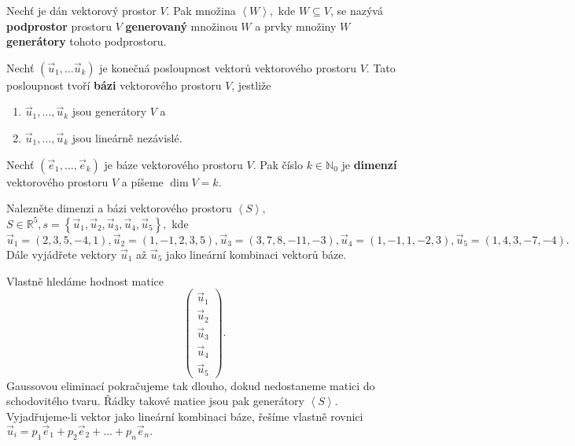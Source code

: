 \begin{definition}
    Nechť je dán vektorový prostor $V$. Pak množina $\left < W \right >,$ kde $
    W\subseteq V$, se nazývá \textbf{podprostor} prostoru $V$ \textbf{generovaný}
    množinou $W$ a prvky množiny $W$ \textbf{generátory} tohoto podprostoru.
\end{definition}

\begin{definition}
    Nechť $(\vec u_1, \dots \vec u_k)$ je konečná posloupnost vektorů vektorového
    prostoru $V$. Tato posloupnost tvoří \textbf{bázi} vektorového prostoru $V$, jestliže
    \begin{enumerate}[$i.$]
    \item $\vec u_1, \dots, \vec u_k$ jsou generátory $V$ a
   	\item $\vec u_1, \dots, \vec u_k$ jsou lineárně nezávislé.
    \end{enumerate}
\end{definition}

\begin{definition}
Nechť $(\vec e_1,\dots, \vec e_k)$ je báze vektorového prostoru $V$. Pak číslo $k \in
\mathbb N_0$ je \textbf{dimenzí} vektorového prostoru $V$ a píšeme $\dim V=k$.
\end{definition}

\begin{priklad}
Nalezněte dimenzi a bázi vektorového prostoru $\left < S \right > ,$
$S \in \mathbb R^{5}, s = \left \{ \vec u_1,\vec u_2,\vec u_3,\vec u_4,\vec u_5 \right \}, $
kde $\vec u_1=(2,3,5,-4,1),\vec u_2=(1,-1,2,3,5),\vec u_3=(3,7,8,-11,-3),\vec u_4=(1,-1,1,-2,3),\vec u_5=(1,4,3,-7,-4).$
Dále vyjádřete vektory $\vec u_1$ až $\vec u_5$ jako lineární kombinaci vektorů báze.
\end{priklad}

\begin{reseni}
Vlastně hledáme hodnost matice
$$
\begin{pmatrix}
    \vec u_1\\
   \vec u_2\\
  \vec u_3\\
 \vec u_4\\
\vec u_5
\end{pmatrix}.
$$
Gaussovou eliminací pokračujeme tak dlouho, dokud nedostaneme matici do schodovitého tvaru.
Řádky takové matice jsou pak generátory $\left < S \right > .$
Vyjadřujeme-li vektor jako lineární kombinaci báze, řešíme vlastně rovnici
$\vec u_i = p_1\vec e_1 + p_2\vec e_2 +\dots + p_n\vec e_n.$
\end{reseni}

